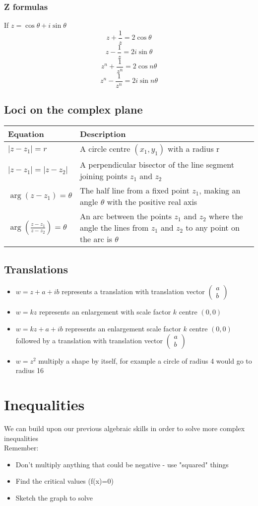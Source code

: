 \documentclass{article}[18pt]
\begin{document}
\subsubsection{Z formulas}
If $z=\cos\theta+i\sin\theta$
$$z+\frac{1}{z}=2\cos\theta$$
$$z-\frac{1}{z}=2i\sin\theta$$
$$z^n+\frac{1}{z^n}=2\cos n\theta$$
$$z^n-\frac{1}{z^n}=2i\sin n\theta$$
\subsection{Loci on the complex plane}
\begin{tabularx}{\textwidth}{|X|X|}
\hline
Equation&Description\\
\hline
{\Large$|z-z_1|=r$}&A circle centre $(x_1,y_1)$ with a radius r\\
\hline
{\Large$|z-z_1|=|z-z_2|$}&A perpendicular bisector of the line segment joining points $z_1$ and $z_2$\\
\hline
{\Large$\arg(z-z_1)=\theta$}&The half line from a fixed point $z_1$, making an angle $\theta$ with the positive real axis\\
\hline
{\Large$\arg(\frac{z-z_1}{z-z_2})=\theta$}&An arc between the points $z_1$ and $z_2$ where the angle the lines from $z_1$ and $z_2$ to any point on the arc is $\theta$\\
\hline
\end{tabularx}
\subsection{Translations}
\begin{itemize}
\item $w=z+a+ib$ represents a translation with translation vector $\begin{pmatrix}
a\\b
\end{pmatrix}$
\item $w=kz$ represents an enlargement with scale factor $k$ centre $(0,0)$
\item $w=kz+a+ib$ represents an enlargement scale factor $k$ centre $(0,0)$ followed by a translation with translation vector $\begin{pmatrix}
a\\b
\end{pmatrix}$
\item $w=z^2$ multiply a shape by itself, for example a circle of radius 4 would go to radius 16
\end{itemize}
\section{Inequalities}
We can build upon our previous algebraic skills in order to solve more complex inequalities\\
Remember:
\begin{itemize}
\item Don't multiply anything that could be negative - use "squared" things
\item Find the critical values (f(x)=0)
\item Sketch the graph to solve
\end{itemize}
\end{document}
